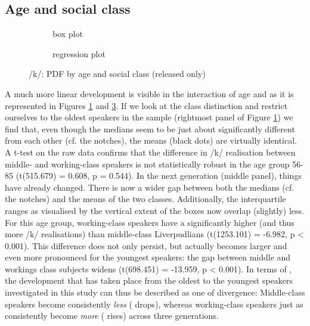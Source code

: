 \subsection{Age and social class}
\label{sec.prod.res.con.k.ageclass}

\begin{figure}[h]
	\centering
	\begin{subfigure}{.49\textwidth}
		\centering
			\resizebox{\linewidth}{!}{} 
		\caption{box plot}
		\label{fig.box.k.ageclass}
	\end{subfigure}
	\begin{subfigure}{.49\textwidth}
		\centering
			\resizebox{\linewidth}{!}{} 
		\caption{regression plot}
		\label{fig.scatter.k.ageclass}
	\end{subfigure}
	\caption{/k/: PDF by age and social class (released only)}
\end{figure}

A much more linear development is visible in the interaction of age and  as it is represented in Figures \ref{fig.box.k.ageclass} and \ref{fig.scatter.k.ageclass}.
If we look at the class distinction and restrict ourselves to the oldest speakers in the sample (rightmost panel of Figure \ref{fig.box.k.ageclass}) we find that, even though the medians seem to be just about significantly different from each other (cf. the notches), the means (black dots) are virtually identical.
A t-test on the raw data confirms that the difference in /k/ realisation between middle- and working-class speakers is not statistically robust in the age group 56-85 (t(515.679) = 0.608, p = 0.544).
In the next generation (middle panel), things have already changed.
There is now a wider gap between both the medians (cf. the notches) and the means of the two classes.
Additionally, the interquartile ranges as visualised by the vertical extent of the boxes now overlap (slightly) less.
For this age group, working-class speakers have a significantly higher  (and thus more  /k/ realisations) than middle-class Liverpudlians (t(1253.101) = -6.982, p < 0.001).
This difference does not only persist, but actually becomes larger and even more pronounced for the youngest speakers: the gap between middle and workings class subjects widens (t(698.451) = -13.959, p < 0.001).
In terms of , the development that has taken place from the oldest to the youngest speakers investigated in this study can thus be described as one of divergence: Middle-class speakers become consistently \emph{less}  ( drops), whereas working-class speakers just as consistently become \emph{more}  ( rises) across three generations.

